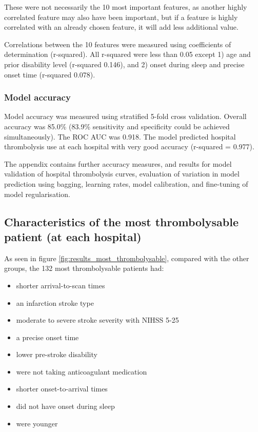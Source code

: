 These were not necessarily the 10 most important features, as another highly correlated feature may also have been important, but if a feature is highly correlated with an already chosen feature, it will add less additional value.

Correlations between the 10 features were measured using coefficients of determination (r-squared). All r-squared were less than 0.05 except 1) age and prior disability level (r-squared 0.146), and 2) onset during sleep and precise onset time (r-squared 0.078).


\subsubsection{Model accuracy}

Model accuracy was measured using stratified 5-fold cross validation. Overall accuracy was 85.0\% (83.9\% sensitivity and specificity could be achieved simultaneously). The ROC AUC was 0.918. The model predicted hospital thrombolysis use at each hospital with very good accuracy (r-squared = 0.977).

The appendix contains further accuracy measures, and results for model validation of hospital thrombolysis curves, evaluation of variation in model prediction using bagging, learning rates, model calibration, and fine-tuning of model regularisation.


\subsection{Characteristics of the most thrombolysable patient (at each hospital)}

As seen in figure \ref{fig:results_most_thrombolysable}, compared with the other groups, the 132 most thrombolysable patients had:
\begin{itemize}
    \item shorter arrival-to-scan times
    \item an infarction stroke type
    \item moderate to severe stroke severity with NIHSS 5-25
    \item a precise onset time
    \item lower pre-stroke disability
    \item were not taking anticoagulant medication
    \item shorter onset-to-arrival times
    \item did not have onset during sleep
    \item were younger
\end{itemize}

